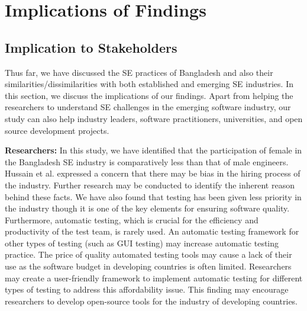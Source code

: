 \section{Implications of Findings}


\label{implications}

\subsection{Implication to Stakeholders}
Thus far, we have discussed the SE practices of Bangladesh and also their similarities/dissimilarities with both established and emerging SE industries. In this section, we discuss the implications of our findings. Apart from helping the researchers to understand SE challenges in the emerging software industry, our study can also help industry leaders, software practitioners, universities, and open source development projects.

\indent \textbf{Researchers:} In this study, we have identified that the participation of female in the Bangladesh SE industry is comparatively less than that of male engineers.  Hussain et al.\citep{Hussain2020} expressed a concern that there may be bias in the hiring process of the industry. Further research may be conducted to identify the inherent reason behind these facts. We have also found that testing has been given less priority in the industry though it is one of the key elements for ensuring software quality. Furthermore, automatic testing, which is crucial for the efficiency and productivity of the test team, is rarely used. An automatic testing framework for other types of testing (such as GUI testing) may increase automatic testing practice. The price of quality automated testing tools may cause a lack of their use as the software budget in developing countries is often limited. Researchers may create a user-friendly framework to implement automatic testing for different types of testing to address this affordability issue. This finding may encourage researchers to develop open-source tools for the industry of developing countries. 


